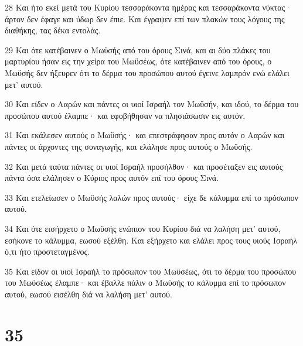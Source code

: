 \par 28 Και ήτο εκεί μετά του Κυρίου τεσσαράκοντα ημέρας και τεσσαράκοντα νύκτας· άρτον δεν έφαγε και ύδωρ δεν έπιε. Και έγραψεν επί των πλακών τους λόγους της διαθήκης, τας δέκα εντολάς.
\par 29 Και ότε κατέβαινεν ο Μωϋσής από του όρους Σινά, και αι δύο πλάκες του μαρτυρίου ήσαν εις την χείρα του Μωϋσέως, ότε κατέβαινεν από του όρους, ο Μωϋσής δεν ήξευρεν ότι το δέρμα του προσώπου αυτού έγεινε λαμπρόν ενώ ελάλει μετ' αυτού.
\par 30 Και είδεν ο Ααρών και πάντες οι υιοί Ισραήλ τον Μωϋσήν, και ιδού, το δέρμα του προσώπου αυτού έλαμπε· και εφοβήθησαν να πλησιάσωσιν εις αυτόν.
\par 31 Και εκάλεσεν αυτούς ο Μωϋσής· και επεστράφησαν προς αυτόν ο Ααρών και πάντες οι άρχοντες της συναγωγής, και ελάλησε προς αυτούς ο Μωϋσής.
\par 32 Και μετά ταύτα πάντες οι υιοί Ισραήλ προσήλθον· και προσέταξεν εις αυτούς πάντα όσα ελάλησεν ο Κύριος προς αυτόν επί του όρους Σινά.
\par 33 Και ετελείωσεν ο Μωϋσής λαλών προς αυτούς· είχε δε κάλυμμα επί το πρόσωπον αυτού.
\par 34 Και ότε εισήρχετο ο Μωϋσής ενώπιον του Κυρίου διά να λαλήση μετ' αυτού, εσήκονε το κάλυμμα, εωσού εξέλθη. Και εξήρχετο και ελάλει προς τους υιούς Ισραήλ ό,τι ήτο προστεταγμένος.
\par 35 Και είδον οι υιοί Ισραήλ το πρόσωπον του Μωϋσέως, ότι το δέρμα του προσώπου του Μωϋσέως έλαμπε· και έβαλλε πάλιν ο Μωϋσής το κάλυμμα επί το πρόσωπον αυτού, εωσού εισέλθη διά να λαλήση μετ' αυτού.

\chapter{35}

